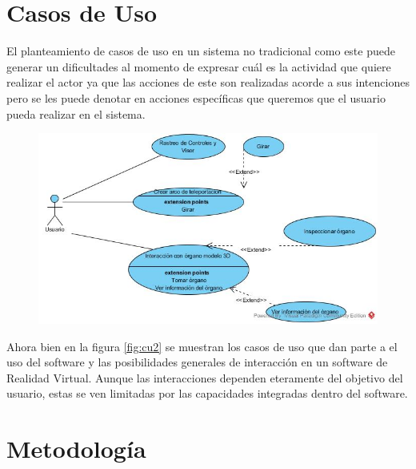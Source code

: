 \section{Casos de Uso}
El planteamiento de casos de uso en un sistema no tradicional como este puede generar un dificultades al momento de expresar cuál es la actividad que quiere 
realizar el actor ya que las acciones de este son realizadas acorde a sus intenciones pero se les puede denotar en acciones específicas que queremos que el 
usuario pueda realizar en el sistema.\\
\begin{figure}[H]
	\begin{center}
 		\includegraphics[width = 1\textwidth]{v3/images/cu1.jpg}
	\end{center} 
\end{figure}
Ahora bien en la figura \ref{fig:cu2} se muestran los casos de uso que dan parte a el uso del software y las posibilidades generales de interacción en un software de 
Realidad Virtual. Aunque las interacciones dependen eteramente del objetivo del usuario, estas se ven limitadas por las capacidades integradas dentro del software.\\

\section{Metodología}

